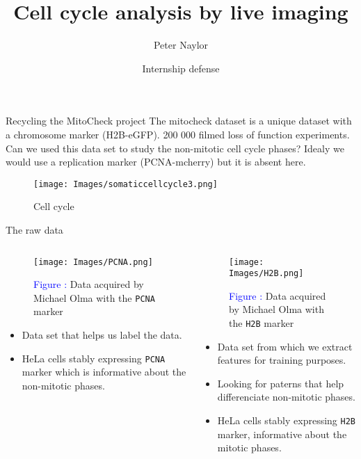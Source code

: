 \documentclass{beamer}
\title{Cell cycle analysis by live imaging}
\author{Peter Naylor}
\date{Internship defense}
\begin{document}
\begin{frame}{Recycling the MitoCheck project}
The mitocheck dataset is a unique dataset with a chromosome marker (H2B-eGFP). 200 000 filmed loss of function experiments. Can we used this data set to study the non-mitotic cell cycle phases? Idealy we would use a replication marker (PCNA-mcherry) but it is absent here.
\begin{figure}[!ht]
\centering
\texttt{[image: Images/somaticcellcycle3.png]}
\caption{Cell cycle}
\label{cellcycle}
\end{figure}

\end{frame}

\begin{frame}{The raw data}
\begin{columns}[T] %
\begin{column}{.40\textwidth}
\begin{footnotesize}
\begin{figure}[!ht]
\centering
\texttt{[image: Images/PCNA.png]}
\caption{\textcolor{blue}{Figure :} Data acquired by Michael Olma with the \texttt{PCNA} marker}
\label{PCNA_michael_olma}
\end{figure}
\begin{itemize}
\item Data set that helps us label the data.
\item HeLa cells stably expressing \texttt{PCNA} marker which is informative about the non-mitotic phases.
\end{itemize}
\end{footnotesize}
\end{column}%
\hfill%
\begin{column}{.56\textwidth}
\begin{footnotesize}
\begin{figure}[!ht]
\centering
\texttt{[image: Images/H2B.png]}
\caption{\textcolor{blue}{Figure :} Data acquired by Michael Olma with the \texttt{H2B} marker}
\label{H2B}
\end{figure}
\begin{itemize}
\item Data set from which we extract features for training purposes. 
\item Looking for paterns that help differenciate non-mitotic phases.
\item HeLa cells stably expressing \texttt{H2B} marker, informative about the mitotic phases.
\end{itemize}
\end{footnotesize}
\end{column}%
\end{columns}
\end{frame}
\end{document}
